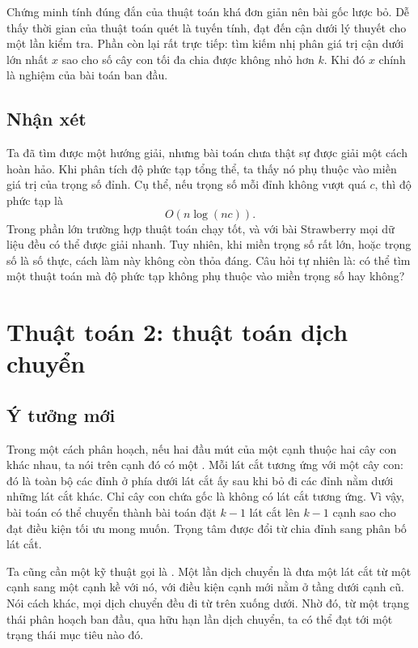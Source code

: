 \documentclass[11pt]{article}
\begin{document}
Chứng minh tính đúng đắn của thuật toán khá đơn giản nên bài gốc lược bỏ.
Dễ thấy thời gian của thuật toán quét là tuyến tính, đạt đến cận dưới lý
thuyết cho một lần kiểm tra. Phần còn lại rất trực tiếp: tìm kiếm nhị phân giá
trị cận dưới lớn nhất $x$ sao cho số cây con tối đa chia được không nhỏ hơn
$k$. Khi đó $x$ chính là nghiệm của bài toán ban đầu.

\subsection{Nhận xét}

Ta đã tìm được một hướng giải, nhưng bài toán chưa thật sự được giải một cách
hoàn hảo. Khi phân tích độ phức tạp tổng thể, ta thấy nó phụ thuộc vào miền
giá trị của trọng số đỉnh. Cụ thể, nếu trọng số mỗi đỉnh không vượt quá $c$,
thì độ phức tạp là
\[
  O(n\log(nc)).
\]
Trong phần lớn trường hợp thuật toán chạy tốt, và với bài Strawberry mọi dữ
liệu đều có thể được giải nhanh. Tuy nhiên, khi miền trọng số rất lớn, hoặc
trọng số là số thực, cách làm này không còn thỏa đáng. Câu hỏi tự nhiên là:
có thể tìm một thuật toán mà độ phức tạp không phụ thuộc vào miền trọng số hay
không?

\section{Thuật toán 2: thuật toán dịch chuyển}

\subsection{Ý tưởng mới}

Trong một cách phân hoạch, nếu hai đầu mút của một cạnh thuộc hai cây con khác
nhau, ta nói trên cạnh đó có một . Mỗi lát cắt tương ứng với một
cây con: đó là toàn bộ các đỉnh ở phía dưới lát cắt ấy sau khi bỏ đi các đỉnh
nằm dưới những lát cắt khác. Chỉ cây con chứa gốc là không có lát cắt tương
ứng. Vì vậy, bài toán có thể chuyển thành bài toán đặt $k-1$ lát cắt lên
$k-1$ cạnh sao cho đạt điều kiện tối ưu mong muốn. Trọng tâm được đổi từ chia
đỉnh sang phân bố lát cắt.

Ta cũng cần một kỹ thuật gọi là . Một lần dịch chuyển là đưa
một lát cắt từ một cạnh sang một cạnh kề với nó, với điều kiện cạnh mới nằm ở
tầng dưới cạnh cũ. Nói cách khác, mọi dịch chuyển đều đi từ trên xuống dưới.
Nhờ đó, từ một trạng thái phân hoạch ban đầu, qua hữu hạn lần dịch chuyển, ta
có thể đạt tới một trạng thái mục tiêu nào đó.
\end{document}
